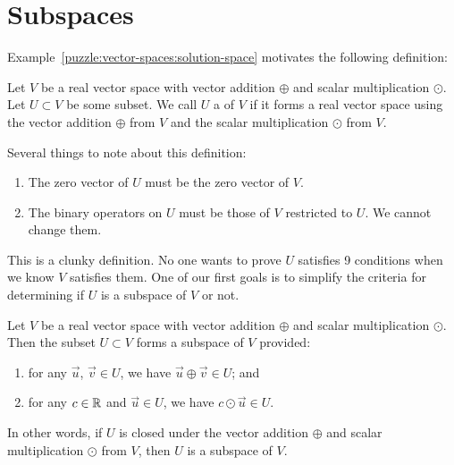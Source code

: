 \section{Subspaces}

\M
Example~\ref{puzzle:vector-spaces:solution-space} motivates the
following definition:

\begin{definition}
Let $V$ be a real vector space with vector addition $\oplus$ and scalar
multiplication $\odot$.
Let $U\subset V$ be some subset. We call $U$ a  of $V$
if
it forms a real vector space using
the vector addition $\oplus$ from $V$ and the scalar multiplication $\odot$ from $V$.
\end{definition}

\begin{remark}
  Several things to note about this definition:
  \begin{enumerate}
  \item The zero vector of $U$ must be the zero vector of $V$.
  \item The binary operators on $U$ must be those of $V$ restricted to
    $U$. We cannot change them.
  \end{enumerate}
\end{remark}

\begin{remark}
This is a clunky definition. No one wants to prove $U$ satisfies 9
conditions when we know $V$ satisfies them. One of our first goals is to
simplify the criteria for determining if $U$ is a subspace of $V$ or not.
\end{remark}

\begin{theorem}
Let $V$ be a real vector space with vector addition $\oplus$ and scalar
multiplication $\odot$. Then the subset $U\subset V$ forms a subspace of
$V$ provided:
\begin{enumerate}
\item for any $\vec{u}$, $\vec{v}\in U$, we have
  $\vec{u}\oplus\vec{v}\in U$; and
\item for any $c\in\mathbb{R}$ and $\vec{u}\in U$, we have $c\odot\vec{u}\in U$.
\end{enumerate}
\end{theorem}

In other words, if $U$ is closed under the vector addition
$\oplus$ and scalar multiplication $\odot$ from $V$, then $U$ is a
subspace of $V$.

